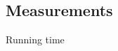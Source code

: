 \documentclass{beamer}
\begin{document}
\subsection{Measurements}
\begin{frame}{Running time}
    
\end{frame}

\begin{frame}
\end{frame}

\begin{frame}
\end{frame}
\end{document}
